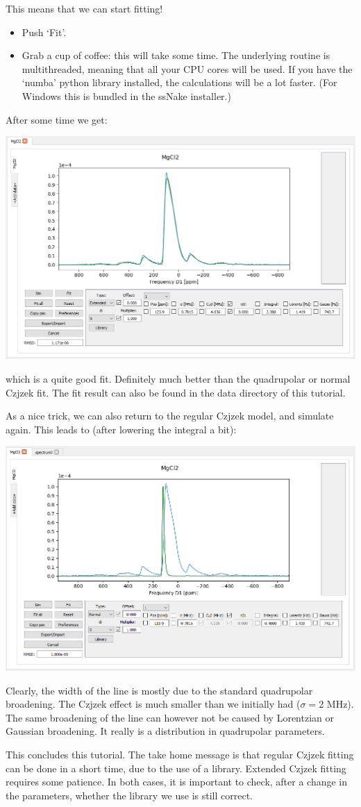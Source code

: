 \documentclass[11pt,a4paper]{article}
\begin{document}
This means that we can start fitting!
\begin{itemize}
  \item Push `Fit'.
  \item Grab a cup of coffee: this will take some time. The underlying routine is multithreaded, meaning that all your CPU cores will be used. If you have the `numba' python library installed, the calculations will be a lot faster. (For Windows this is bundled in the ssNake installer.)
\end{itemize}
After some time we get:
\begin{center}
\includegraphics[width=0.8\linewidth]{Figs/fig12.PNG}
\end{center}
which is a quite good fit. Definitely much better than the quadrupolar or normal Czjzek fit. The fit result can also be found in the data directory of this tutorial.

As a nice trick, we can also return to the regular Czjzek model, and simulate again. This leads to (after lowering the integral a bit):
\begin{center}
\includegraphics[width=0.8\linewidth]{Figs/fig13.PNG}
\end{center}
Clearly, the width of the line is mostly due to the standard quadrupolar broadening. The Czjzek effect is much smaller than we initially had ($\sigma=2$ MHz). The same broadening of the line can however not be caused by Lorentzian or Gaussian broadening. It really is a distribution in quadrupolar parameters.

This concludes this tutorial. The take home message is that regular Czjzek fitting can be done in a short time, due to the use of a library. Extended Czjzek fitting requires some patience. In both cases, it is important to check, after a change in the parameters, whether the library we use is still correct.
\end{document}
